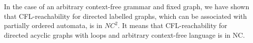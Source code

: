 \documentclass[smallextended]{svjour3}       %
\begin{document}
In the case of an arbitrary context-free grammar and fixed graph, we have shown that CFL-reachability for directed labelled graphs, which can be associated with partially ordered automata, is in $NC^2$. It means that CFL-reachability for directed acyclic graphs with loops and arbitrary context-free language is in NC. 



%
%



%
%
\end{document}
